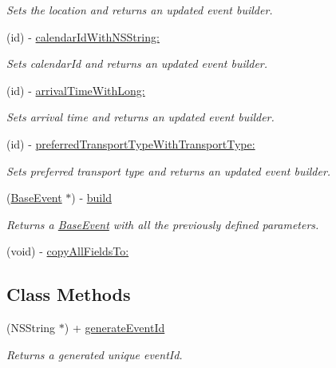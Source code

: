 \begin{DoxyCompactItemize}
\begin{DoxyCompactList}\small\item\em Sets the location and returns an updated event builder. \end{DoxyCompactList}\item 
(id) -\/ \hyperlink{interface_base_event___base_event_builder_a5f3009483b44924df19d581f04ef3436}{calendar\+Id\+With\+N\+S\+String\+:}
\begin{DoxyCompactList}\small\item\em Sets calendar\+Id and returns an updated event builder. \end{DoxyCompactList}\item 
(id) -\/ \hyperlink{interface_base_event___base_event_builder_ad0efc2ede5ac11b45a683f22566ce641}{arrival\+Time\+With\+Long\+:}
\begin{DoxyCompactList}\small\item\em Sets arrival time and returns an updated event builder. \end{DoxyCompactList}\item 
(id) -\/ \hyperlink{interface_base_event___base_event_builder_a3162b522559a4d6ca2eada960e3ebaa8}{preferred\+Transport\+Type\+With\+Transport\+Type\+:}
\begin{DoxyCompactList}\small\item\em Sets preferred transport type and returns an updated event builder. \end{DoxyCompactList}\item 
(\hyperlink{interface_base_event}{Base\+Event} $\ast$) -\/ \hyperlink{interface_base_event___base_event_builder_aad8b1cfd4b7d6a5748ba871a32de9b4f}{build}
\begin{DoxyCompactList}\small\item\em Returns a \hyperlink{interface_base_event}{Base\+Event} with all the previously defined parameters. \end{DoxyCompactList}\item 
(void) -\/ \hyperlink{interface_base_event___base_event_builder_a050ccbbc8d20edad0f7e2cc095eb7c23}{copy\+All\+Fields\+To\+:}
\end{DoxyCompactItemize}
\subsection*{Class Methods}
\begin{DoxyCompactItemize}
\item 
(N\+S\+String $\ast$) + \hyperlink{interface_base_event___base_event_builder_ad9a3ff4876b37d9b219923c2c47ae35f}{generate\+Event\+Id}
\begin{DoxyCompactList}\small\item\em Returns a generated unique event\+Id. \end{DoxyCompactList}\end{DoxyCompactItemize}

